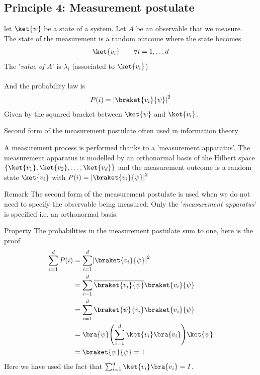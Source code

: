 \subsection{Principle 4: Measurement postulate}
\begin{center}
    let $\ket{\psi}$ be a state of a system. Let $A$ be an observable that we measure.\\
	The state of the measurement is a random outcome where the state becomes 
	\begin{align*} 
		\ket{v_i} \mathspace \mathspace \forall i = 1, \ldots d 
	\end{align*}
	The '\textit{value of $A$}' is $\lambda_i$ (associated to $\ket{v_i}$)\\
	$ $\\
	And the probability law is 
	\begin{align*} 
		P\left(i\right) = \left|\braket{v_i}{\psi}\right|^2 
	\end{align*}
	Given by the squared bracket between $\ket{\psi}$ and $\ket{v_i}$.
\end{center}
\begin{parag}{Second form of the measurement postulate often used in information theory}
    \begin{center}
		A measurement process is performed thanks to a 'measurement apparatus'. The measurement apparatus is modelled by an orthonormal basis of the Hilbert space $\left\{\ket{v_1}, \ket{v_2}, \ldots, \ket{v_d}\right\}$ and the measurement outcome is a random state $\ket{v_i}$ with $P\left(i\right) = \left|\braket{v_i}{\psi}\right|^2$
    \end{center}
	\begin{subparag}{Remark}
	    The second form of the measurement postulate is used when we do not need to specify the observable being measured. Only the '\textit{measurement apparatus}' is specified i.e. an orthonormal basis.
	\end{subparag}
\end{parag}
\begin{parag}{Property}
    The probabilities in the measurement postulate sum to one, here is the proof
	\begin{align*} 
		\sum_{i= 1}^{d} P\left(i\right) &= \sum_{i= 1}^{d} \left|\braket{v_i}{\psi}\right|^2\\
										&= \sum_{i= 1}^{d} \overline{\braket{v_i}{\psi}} \braket{v_i}{\psi}\\
										&= \sum_{i= 1}^{d} \braket{\psi}{v_i}\braket{v_i}{\psi}\\
										&=  \bra{\psi} \left(\sum_{i= 1}^{d}\ket{v_i}\bra{v_i}\right)\ket{\psi}\\
										&= \braket{\psi}{\psi} = 1
	\end{align*}
	Here we have used the fact that $\sum_{i= 1}^{d}\ket{v_i}\bra{v_i} = I$.
\end{parag}

